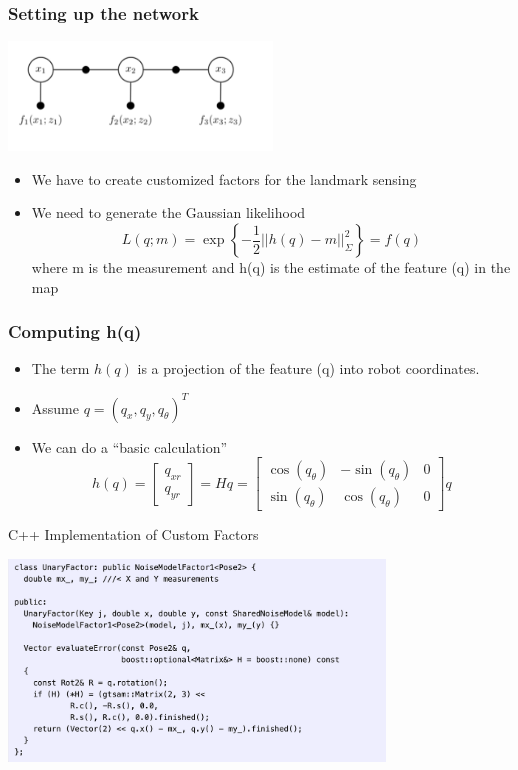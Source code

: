 \documentclass[10pt]{beamer}
\begin{document}
\begin{frame}
  \frametitle{Setting up the network}
  \centerline{\includegraphics[width=7cm]{FactorGraph2.png}}
  \begin{itemize}
    \item We have to create customized factors for the landmark sensing
    \item We need to generate the Gaussian likelihood 
    \[
      L(q;m)= \exp \left\{-\frac{1}{2}||h(q) - m||^2_{\Sigma}\right\}=f(q)
    \] 
    where m is the measurement and h(q) is the estimate of the feature (q) in the map
  \end{itemize}
\end{frame}

\begin{frame}
  \frametitle{Computing h(q)}
  \begin{itemize}
    \item The term $h(q)$ is a projection of the feature (q) into robot coordinates. 
    \item Assume $q = (q_x, q_y, q_{\theta})^T$ 
    \item We can do a ``basic calculation''
    \[ h(q) = \left[ \begin{array}{c} q_{xr} \\ q_{yr} \end{array} \right] 
            = H q = \left[ \begin{array}{ccc} \cos(q_{\theta}) & -\sin(q_{\theta}) & 0 \\ 
                                              \sin(q_{\theta}) & \cos(q_{\theta}) & 0\end{array} \right] q 
    \]
  \end{itemize}
\end{frame}

\begin{frame}{C++ Implementation of Custom Factors}
  \centerline{\includegraphics[width=10cm]{measurement-factor.png}}
\end{frame}
\end{document}
